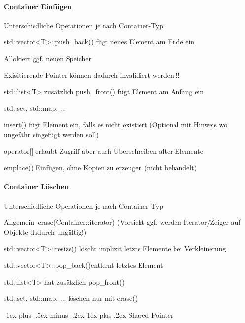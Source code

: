 \documentclass[10pt]{article}
\makeatletter
\renewcommand{\subsubsection}{\@startsection{subsubsection}{3}{0mm}%
                                {-1ex plus -.5ex minus -.2ex}%
                                {1ex plus .2ex}%
                                {\normalfont\small\bfseries}}
\makeatother
\begin{document}
\paragraph{Container Einfügen}
\begin{itemize*}
  \item Unterschiedliche Operationen je nach Container-Typ
  \item std::vector<T>::push\_back() fügt neues Element am Ende ein
  \begin{itemize*}
    \item Allokiert ggf. neuen Speicher
    \item Exisitierende Pointer können dadurch invalidiert werden!!!
  \end{itemize*}
  \item std::list<T> zusätzlich push\_front() fügt Element am Anfang ein
  \item std::set, std::map, ...
  \begin{itemize*}
    \item insert() fügt Element ein, falls es nicht existiert (Optional mit Hinweis wo ungefähr eingefügt werden soll)
    \item operator[] erlaubt Zugriff aber auch Überschreiben alter Elemente
    \item emplace() Einfügen, ohne Kopien zu erzeugen (nicht behandelt)
  \end{itemize*}
\end{itemize*}

\paragraph{Container Löschen}
\begin{itemize*}
  \item Unterschiedliche Operationen je nach Container-Typ
  \item Allgemein: erase(Container::iterator) (Vorsicht ggf. werden Iterator/Zeiger auf Objekte dadurch ungültig!)
  \item std::vector<T>::resize() löscht implizit letzte Elemente bei Verkleinerung
  \item std::vector<T>::pop\_back()entfernt letztes Element
  \item std::list<T> hat zusätzlich pop\_front()
  \item std::set, std::map, ... löschen nur mit erase()
\end{itemize*}

\subsubsection{Shared Pointer}
\end{document}
